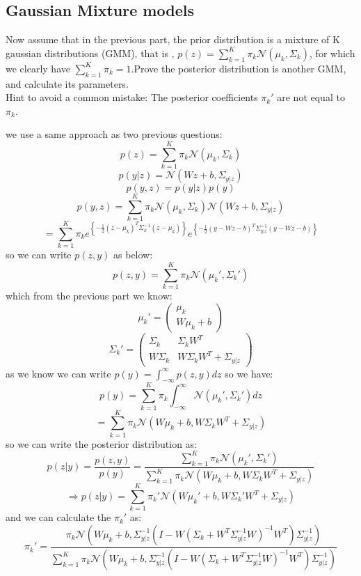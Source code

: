 \subsection{Gaussian Mixture models}
Now assume that in the previous part, the prior distribution is a mixture of K gaussian distributions (GMM), that is , $p(z) = \sum_{k=1}^{K} \pi_k \mathcal{N}(\mu_k , \Sigma_k)$, for which we clearly have $\sum_{k=1}^{K} \pi_k = 1$.Prove the posterior distribution is another GMM, and calculate its parameters.\\
Hint to avoid a common mistake: The posterior coefficients $\pi_k'$ are not equal to $\pi_k$.
\begin{qsolve}
	\begin{qsolve}[]
		we use a same approach as two previous questions:
		$$p(z) = \sum_{k=1}^{K} \pi_k \mathcal{N}(\mu_k , \Sigma_k)$$
		\splitqsolve[\splitqsolve]
		$$p(y|z) = \mathcal{N}(Wz + b , \Sigma_{y|z})$$
		$$p(y,z) = p(y|z)p(y)$$
		$$p(y,z) = \sum_{k=1}^{K} \pi_k \mathcal{N}(\mu_k , \Sigma_k) \mathcal{N}(Wz + b , \Sigma_{y|z})$$
		$$ = \sum_{k=1}^{K} \pi_k e^{\left\{-\frac{1}{2} (z-\mu_k)^T \Sigma_k^{-1} (z-\mu_k) \right\}} e^{\left\{-\frac{1}{2} (y-Wz-b)^T \Sigma_{y|z}^{-1} (y-Wz-b) \right\}}$$
		so we can write $p(z,y)$ as below:
		$$p(z,y) = \sum_{k=1}^{K} \pi_k \mathcal{N}(\mu_k' , \Sigma_k') $$
		which from the previous part we know:
		$$\mu_k' = \begin{pmatrix}\mu_k \\ W\mu_k+b\end{pmatrix}$$
		$$\Sigma_k' = \begin{pmatrix}\Sigma_k & \Sigma_kW^T \\ W\Sigma_k & W\Sigma_kW^T + \Sigma_{y|z}\end{pmatrix}$$
		as we know we can write $p(y) = \int_{-\infty}^{\infty} p(z,y) dz$ so we have:
		$$p(y) = \sum_{k=1}^{K} \pi_k \int_{-\infty}^{\infty} \mathcal{N}(\mu_k' , \Sigma_k') dz$$
		$$ = \sum_{k=1}^{K} \pi_k \mathcal{N}(W \mu_k + b , W\Sigma_kW^T + \Sigma_{y|z})$$
		so we can write the posterior distribution as:
		$$p(z|y) = \dfrac{p(z,y)}{p(y)} = \dfrac{\sum_{k=1}^{K} \pi_k \mathcal{N}(\mu_k' , \Sigma_k')}{\sum_{k=1}^{K} \pi_k \mathcal{N}(W \mu_k + b , W\Sigma_kW^T + \Sigma_{y|z})}$$
		$$\Rightarrow p(z|y) = \sum_{k=1}^{K} \pi_k' \mathcal{N} (W\mu_k' + b , W\Sigma_k'W^T + \Sigma_{y|z})$$
		and we can calculate the $\pi_k'$ as:
		$$\pi_k' = \dfrac{\pi_k  \mathcal{N}(W \mu_k + b , \Sigma_{y|z}^{-1} (I - W(\Sigma_k + W^T \Sigma_{y|z}^{-1} W)^{-1}W^T)\Sigma_{y|z}^{-1})}{\sum_{k=1}^{K} \pi_k \mathcal{N}(W \mu_k + b , \Sigma_{y|z}^{-1} (I - W(\Sigma_k + W^T \Sigma_{y|z}^{-1} W)^{-1}W^T)\Sigma_{y|z}^{-1})}$$
	\end{qsolve}
\end{qsolve}